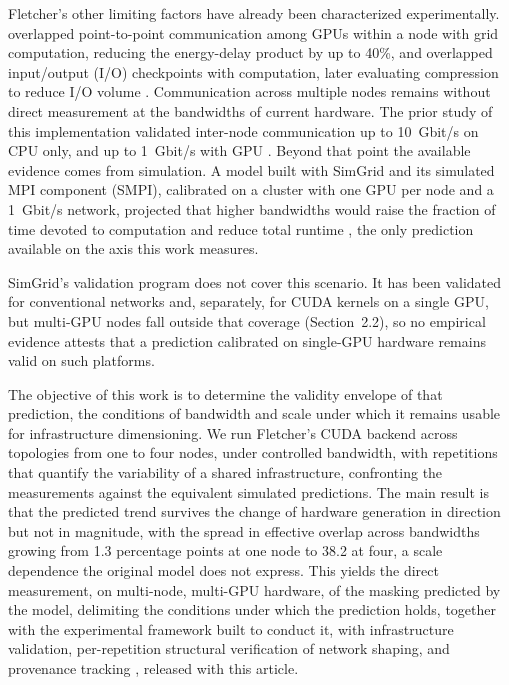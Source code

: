 \documentclass[12pt]{article}
\begin{document}
Fletcher's other limiting factors have already been characterized experimentally. \cite{rigon2024otimizando} overlapped point-to-point communication among GPUs within a node with grid computation, reducing the energy-delay product by up to 40\%, and \cite{kunas2024enhancing} overlapped input/output (I/O) checkpoints with computation, later evaluating compression to reduce I/O volume \cite{kunas2025compressao}. Communication across multiple nodes remains without direct measurement at the bandwidths of current hardware. The prior study of this implementation validated inter-node communication up to 10~Gbit/s on CPU only, and up to 1~Gbit/s with GPU \cite{spadotto2026sbacpad}. Beyond that point the available evidence comes from simulation. A model built with SimGrid and its simulated MPI component (SMPI), calibrated on a cluster with one GPU per node and a 1~Gbit/s network, projected that higher bandwidths would raise the fraction of time devoted to computation and reduce total runtime \cite{spadotto2026carla,spadotto2026tcc}, the only prediction available on the axis this work measures.

SimGrid's validation program does not cover this scenario. It has been validated for conventional networks and, separately, for CUDA kernels on a single GPU, but multi-GPU nodes fall outside that coverage (Section~2.2), so no empirical evidence attests that a prediction calibrated on single-GPU hardware remains valid on such platforms.

The objective of this work is to determine the validity envelope of that prediction, the conditions of bandwidth and scale under which it remains usable for infrastructure dimensioning. We run Fletcher's CUDA backend across topologies from one to four nodes, under controlled bandwidth, with repetitions that quantify the variability of a shared infrastructure, confronting the measurements against the equivalent simulated predictions. The main result is that the predicted trend survives the change of hardware generation in direction but not in magnitude, with the spread in effective overlap across bandwidths growing from 1.3 percentage points at one node to 38.2 at four, a scale dependence the original model does not express. This yields the direct measurement, on multi-node, multi-GPU hardware, of the masking predicted by the model, delimiting the conditions under which the prediction holds, together with the experimental framework built to conduct it, with infrastructure validation, per-repetition structural verification of network shaping, and provenance tracking \cite{cherrueau2022enoslib}, released with this article.
\end{document}
